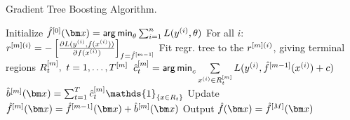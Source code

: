 \begin{algorithm}[H]
  \begin{footnotesize}
  \begin{center}
  \caption{Gradient Tree Boosting Algorithm.}
    \begin{algorithmic}[1]
      \State Initialize $\hat{f}^{[0]}(\xv) = \argmin_{\theta} \sumin L(\yi, \theta)$
          \State For all $i$: $r^{[m](i)} = -\left[\frac{\partial L(y^{(i)}, f(x^{(i)}))}{\partial f(x^{(i)})}\right]_{f=\hat{f}^{[m-1]}}$
          \State Fit regr. tree to the $r^{[m](i)}$, giving terminal regions $R_{t}^{[m]},
          \ t = 1,\ldots,T^{[m]}$
          \State $\hat{c}_t^{[m]} = \mathop{\sf arg\,min}_{c} \sum \limits_{x^{(i)} \in R_{t}^{[m]}} L(y^{(i)}, \hat{f}^{[m-1]}(x^{(i)}) + c)$
        \EndFor
        \State $\bmmh(\xv) = \sum_{t=1}^{T} \ctmh \mathds{1}_{\{x \in R_t\}} $
        \State Update $\fmh(\xv) = \fmdh(\xv) + \bmmh(\xv)$
      \EndFor
      \State Output $\hat{f}(\xv) = \hat{f}^{[M]}(\xv)$
    \end{algorithmic}
    \end{center}
    \end{footnotesize}
\end{algorithm}
